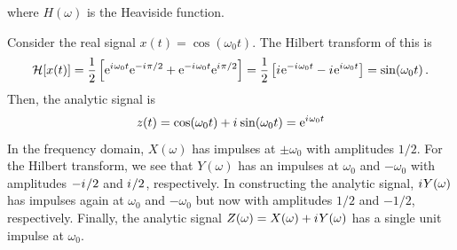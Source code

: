 %
where $H(\omega)$ is the Heaviside function.
%
\begin{exmp}
  Consider the real signal $x(t) = \cos(\omega_0 t)$. The Hilbert transform of this
  is
  \begin{displaymath}
    \mathcal{H}[x(t)]
    = \frac{1}{2}\left[\mathrm{e}^{{i\mkern1mu}\omega_0 t}\mathrm{e}^{-{i\mkern1mu}\pi/2} + \mathrm{e}^{-{i\mkern1mu}\omega_0 t}\mathrm{e}^{{i\mkern1mu}\pi/2}\right]
    = \frac{1}{2}\left[{i\mkern1mu}\mathrm{e}^{-{i\mkern1mu}\omega_0 t} - {i\mkern1mu}\mathrm{e}^{{i\mkern1mu}\omega_0 t}\right]
    = \sin(\omega_0 t) \,.
  \end{displaymath}
  Then, the analytic signal is
  \begin{displaymath}
    z(t) = \cos(\omega_0 t) + {i\mkern1mu}\sin(\omega_0 t) = \mathrm{e}^{{i\mkern1mu}\omega_0 t}
  \end{displaymath}
  In the frequency domain, $X(\omega)$ has impulses at $\pm\omega_0$ with amplitudes
  $1/2$. For the Hilbert transform, we see that $Y(\omega)$ has an impulses
  at $\omega_0$ and $-\omega_0$ with amplitudes $-{i\mkern1mu}/2$ and ${i\mkern1mu}/2$, respectively. 
  In constructing the analytic signal, ${i\mkern1mu} Y(\omega)$ has impulses again at $\omega_0$
  and $-\omega_0$ but now with amplitudes $1/2$ and $-1/2$, respectively. Finally,
  the analytic signal $Z(\omega) = X(\omega) + {i\mkern1mu} Y(\omega)$ has a single unit impulse
  at $\omega_0$.
\end{exmp}
%
